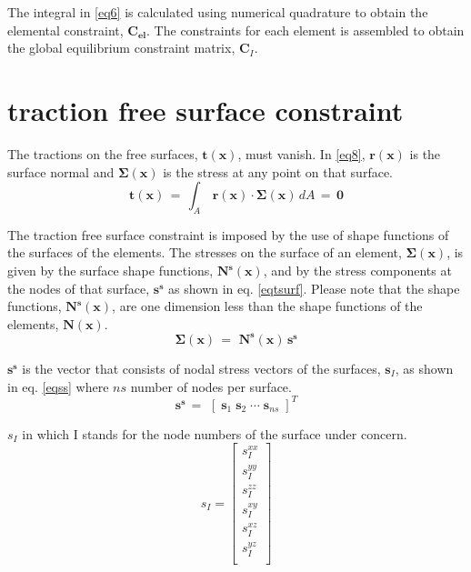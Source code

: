 \documentclass{article}
\begin{document}
The integral in \eqref{eq6} is calculated using numerical quadrature to obtain the elemental constraint, $\mathbf{C_{el}}$. The constraints for each element is assembled to obtain the global equilibrium constraint matrix, $\mathbf{C}_I$.

\section{traction free surface constraint}
The tractions on the free surfaces, $\mathbf{t(x)}$, must vanish. In \eqref{eq8}, $\mathbf{r(x)}$ is the surface normal and $\mathbf{\Sigma(x)}$ is the stress at any point on that surface.
\begin{equation}
\mathbf{t(x)}\,=\,\int _A \, \mathbf{r(x)}  \cdot \mathbf{\Sigma(x)}\, dA \,=\, \mathbf{0}
\label{eq8}
\end{equation}

The traction free surface constraint is imposed by the use of shape functions of the surfaces of the elements. The stresses on the surface of an element, $\mathbf{\Sigma(x)}$, is given by the surface shape functions, $\mathbf{N^s(\mathbf{x})}$, and by the stress components at the nodes of that surface, $\mathbf{s^s}$ as shown in eq. \eqref{eqtsurf}. Please note that the shape functions, $\mathbf{N^s(\mathbf{x})}$, are one dimension less than the shape functions of the elements, $\mathbf{N(\mathbf{x})}$.
\begin{equation}
\mathbf{\Sigma(x)} \,=\, \, \mathbf{N^s(\mathbf{x})} \, \mathbf{s^s}
\label{eqtsurf}
\end{equation}



$\mathbf{s^s}$ is the vector that consists of nodal stress vectors of the surfaces, $\mathbf{s}_I$, as shown in eq. \eqref{eqss} where $ns$ number of nodes per surface.
\begin{equation}
\mathbf{s^s}\,=\, \, \left[\; \mathbf{s}_1\; \mathbf{s}_2 \; \cdots\; \mathbf{s}_{ns}\; \right]^T
\label{eqss}
\end{equation}

$s_I$ in which I stands for the node numbers of the surface under concern.
\begin{equation}
s_I = \left[{
\begin{array}{c}
	s_I^{xx}\\
	s_I^{yy}\\
	s_I^{zz}\\
	s_I^{xy}\\
	s_I^{xz}\\
	s_I^{yz}\\
\end{array}} \right]
\label{eq9}
\end{equation}
\end{document}
